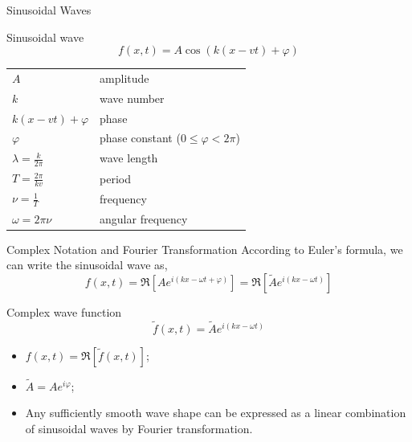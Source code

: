 \documentclass{beamer}
\begin{document}
\begin{frame}{Sinusoidal Waves}
    \begin{block}{Sinusoidal wave}
        \begin{equation}
            f(x, t) = A \cos(k (x - vt) + \varphi)
        \end{equation}
    \end{block}


    \begin{table}[htbp]
        \centering
        \begin{tabular}{ll}
            $A$                        & amplitude                                 \\
            $k$                        & wave number                               \\
            $k(x-vt)+\varphi$          & phase                                     \\
            $\varphi$                  & phase constant ($0 \leq \varphi < 2 \pi$) \\
            $\lambda = \frac{k}{2\pi}$ & wave length                               \\
            $T = \frac{2\pi}{kv}$      & period                                    \\
            $\nu = \frac{1}{T}$        & frequency                                 \\
            $\omega = 2\pi \nu$        & angular frequency                         \\
        \end{tabular}
    \end{table}

\end{frame}


\begin{frame}{Complex Notation and Fourier Transformation}
    According to Euler's formula, we can write the sinusoidal wave as,
    \begin{equation}
        f(x, t) = \Re [A e^{i(kx-\omega t + \varphi)}] = \Re[\tilde{A} e^{i(kx-\omega t)}]
    \end{equation}

    \begin{block}{Complex wave function}
        \begin{equation}
            \tilde{f}(x, t) = \tilde{A} e^{i(kx-\omega t)}
        \end{equation}
    \end{block}

    \begin{itemize}
        \item $f(x, t) = \Re[\tilde{f}(x, t)]$;
        \item $\tilde{A} = A e^{i \varphi}$;
        \item Any sufficiently smooth wave shape can be expressed as a linear combination of sinusoidal waves by Fourier transformation.
    \end{itemize}
\end{frame}
\end{document}
